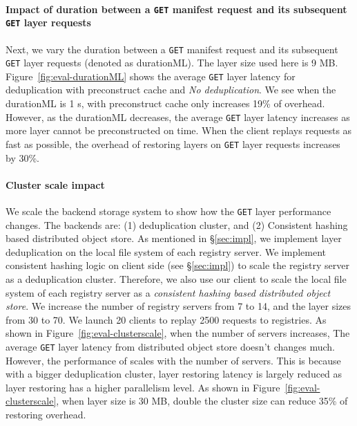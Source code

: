 \paragraph{Impact of duration between a \texttt{GET} manifest request and its subsequent \texttt{GET} layer requests}
Next, 
we vary 
the duration between a \texttt{GET} manifest request and its subsequent \texttt{GET} layer requests (denoted as durationML).
The layer size used here is 9 MB.
%
Figure~\ref{fig:eval-durationML} shows 
the average \texttt{GET} layer latency for \sysname deduplication with preconstruct cache and 
\emph{No deduplication}.
We see when the durationML is 1 s, 
\sysname with preconstruct cache only increases 19\% of overhead.
However, as the durationML decreases,
the average \texttt{GET} layer latency increases as more layer cannot be preconstructed on time.
When the client replays requests as fast as possible,
the overhead of restoring layers on \texttt{GET} layer requests increases by 30\%.


\paragraph{Cluster scale impact}
We scale the backend storage system 
to show how the \texttt{GET} layer performance changes.
 The backends are:
 (1) \sysname deduplication cluster,
 and
 (2) Consistent hashing based distributed object store. 
 As mentioned in \S\ref{sec:impl},
 we implement layer deduplication on the
 local file system of each registry server.
We implement consistent hashing logic on client side (see \S\ref{sec:impl}) to
 scale the registry server as a deduplication cluster.
Therefore,
we also use our client to scale the local file system of each registry server
as a \emph{ consistent hashing based distributed object store}.
We increase the number of registry servers from 7 to 14,
and the layer sizes from 30 to 70.
We launch 20 clients to replay 2500 requests to registries.
%
As shown in Figure~\ref{fig:eval-clusterscale},
when the number of servers increases,
The average \texttt{GET} layer latency from
distributed object store doesn't changes much.
However, the performance of \sysname scales with the number of servers.
This is because with a bigger deduplication cluster,
 layer restoring latency is largely reduced as 
 layer restoring has a higher parallelism level.
 As shown in Figure~\ref{fig:eval-clusterscale},
 when layer size is 30 MB,
 double the cluster size can reduce 35\% of restoring overhead.

